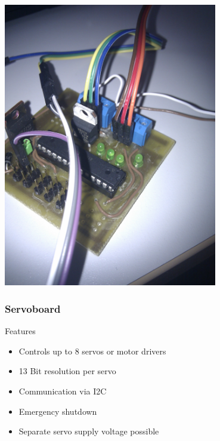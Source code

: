 \documentclass[pdf]{beamer}
\begin{document}
\begin{frame}
  \begin{center}
  \includegraphics[width = 0.7\textwidth]{pics/raw/servoboard_firsttest.jpg}
  \end{center}
\end{frame}
\begin{frame}
\frametitle{Servoboard}
\begin{exampleblock}{Features}
\begin{itemize}
  \item Controls up to 8 servos or motor drivers
  \item 13 Bit resolution per servo
  \item Communication via I2C
  \item Emergency shutdown
  \item Separate servo supply voltage possible
\end{itemize}
\end{exampleblock}
\end{frame}
\end{document}
